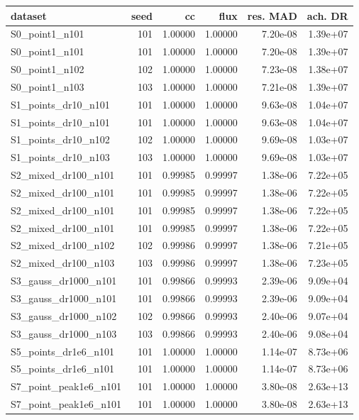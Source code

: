 \begin{tabular}{lrrrrr}
\toprule
dataset & seed & cc & flux & res. MAD & ach. DR \\
\midrule
S0\_point1\_n101 & 101 & 1.00000 & 1.00000 & 7.20e-08 & 1.39e+07 \\
S0\_point1\_n101 & 101 & 1.00000 & 1.00000 & 7.20e-08 & 1.39e+07 \\
S0\_point1\_n102 & 102 & 1.00000 & 1.00000 & 7.23e-08 & 1.38e+07 \\
S0\_point1\_n103 & 103 & 1.00000 & 1.00000 & 7.21e-08 & 1.39e+07 \\
S1\_points\_dr10\_n101 & 101 & 1.00000 & 1.00000 & 9.63e-08 & 1.04e+07 \\
S1\_points\_dr10\_n101 & 101 & 1.00000 & 1.00000 & 9.63e-08 & 1.04e+07 \\
S1\_points\_dr10\_n102 & 102 & 1.00000 & 1.00000 & 9.69e-08 & 1.03e+07 \\
S1\_points\_dr10\_n103 & 103 & 1.00000 & 1.00000 & 9.69e-08 & 1.03e+07 \\
S2\_mixed\_dr100\_n101 & 101 & 0.99985 & 0.99997 & 1.38e-06 & 7.22e+05 \\
S2\_mixed\_dr100\_n101 & 101 & 0.99985 & 0.99997 & 1.38e-06 & 7.22e+05 \\
S2\_mixed\_dr100\_n101 & 101 & 0.99985 & 0.99997 & 1.38e-06 & 7.22e+05 \\
S2\_mixed\_dr100\_n101 & 101 & 0.99985 & 0.99997 & 1.38e-06 & 7.22e+05 \\
S2\_mixed\_dr100\_n102 & 102 & 0.99986 & 0.99997 & 1.38e-06 & 7.21e+05 \\
S2\_mixed\_dr100\_n103 & 103 & 0.99986 & 0.99997 & 1.38e-06 & 7.23e+05 \\
S3\_gauss\_dr1000\_n101 & 101 & 0.99866 & 0.99993 & 2.39e-06 & 9.09e+04 \\
S3\_gauss\_dr1000\_n101 & 101 & 0.99866 & 0.99993 & 2.39e-06 & 9.09e+04 \\
S3\_gauss\_dr1000\_n102 & 102 & 0.99866 & 0.99993 & 2.40e-06 & 9.07e+04 \\
S3\_gauss\_dr1000\_n103 & 103 & 0.99866 & 0.99993 & 2.40e-06 & 9.08e+04 \\
S5\_points\_dr1e6\_n101 & 101 & 1.00000 & 1.00000 & 1.14e-07 & 8.73e+06 \\
S5\_points\_dr1e6\_n101 & 101 & 1.00000 & 1.00000 & 1.14e-07 & 8.73e+06 \\
S7\_point\_peak1e6\_n101 & 101 & 1.00000 & 1.00000 & 3.80e-08 & 2.63e+13 \\
S7\_point\_peak1e6\_n101 & 101 & 1.00000 & 1.00000 & 3.80e-08 & 2.63e+13 \\

\end{tabular}
